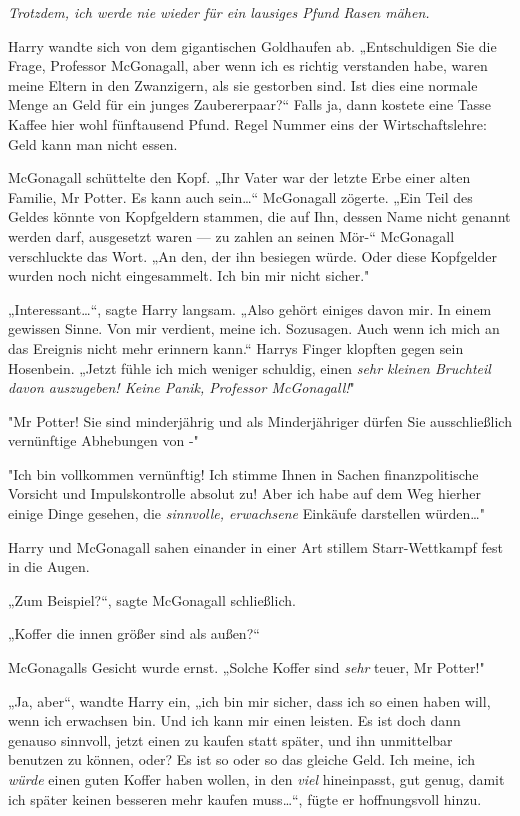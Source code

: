 {\emph{Trotzdem, ich werde nie wieder für ein lausiges Pfund Rasen mähen.}

Harry wandte sich von dem gigantischen Goldhaufen ab. „Entschuldigen Sie die Frage, Professor McGonagall, aber wenn ich es richtig verstanden habe, waren meine Eltern in den Zwanzigern, als sie gestorben sind. Ist dies eine normale Menge an Geld für ein junges Zaubererpaar?“ Falls ja, dann kostete eine Tasse Kaffee hier wohl fünftausend Pfund. Regel Nummer eins der Wirtschaftslehre: Geld kann man nicht essen.

McGonagall schüttelte den Kopf. „Ihr Vater war der letzte Erbe einer alten Familie, Mr Potter. Es kann auch sein…“ McGonagall zögerte. „Ein Teil des Geldes könnte von Kopfgeldern stammen, die auf Ihn, dessen Name nicht genannt werden darf, ausgesetzt waren --- zu zahlen an seinen Mör-“ McGonagall verschluckte das Wort. „An den, der ihn besiegen würde. Oder diese Kopfgelder wurden noch nicht eingesammelt. Ich bin mir nicht sicher."

„Interessant…“, sagte Harry langsam. „Also gehört einiges davon mir. In einem gewissen Sinne. Von mir verdient, meine ich. Sozusagen. Auch wenn ich mich an das Ereignis nicht mehr erinnern kann.“ Harrys Finger klopften gegen sein Hosenbein. „Jetzt fühle ich mich weniger schuldig, einen \emph{sehr kleinen Bruchteil davon auszugeben! Keine Panik, Professor McGonagall!}"

"Mr Potter! Sie sind minderjährig und als Minderjähriger dürfen Sie ausschließlich vernünftige Abhebungen von -"

"Ich bin vollkommen vernünftig! Ich stimme Ihnen in Sachen finanzpolitische Vorsicht und Impulskontrolle absolut zu! Aber ich habe auf dem Weg hierher einige Dinge gesehen, die \emph{sinnvolle, erwachsene} Einkäufe darstellen würden…"

Harry und McGonagall sahen einander in einer Art stillem Starr-Wettkampf fest in die Augen.

„Zum Beispiel?“, sagte McGonagall schließlich.

„Koffer die innen größer sind als außen?“

McGonagalls Gesicht wurde ernst. „Solche Koffer sind \emph{sehr} teuer, Mr Potter!"

„Ja, aber“, wandte Harry ein, „ich bin mir sicher, dass ich so einen haben will, wenn ich erwachsen bin. Und ich kann mir einen leisten. Es ist doch dann genauso sinnvoll, jetzt einen zu kaufen statt später, und ihn unmittelbar benutzen zu können, oder? Es ist so oder so das gleiche Geld. Ich meine, ich \emph{würde} einen guten Koffer haben wollen, in den \emph{viel} hineinpasst, gut genug, damit ich später keinen besseren mehr kaufen muss…“, fügte er hoffnungsvoll hinzu.

}
